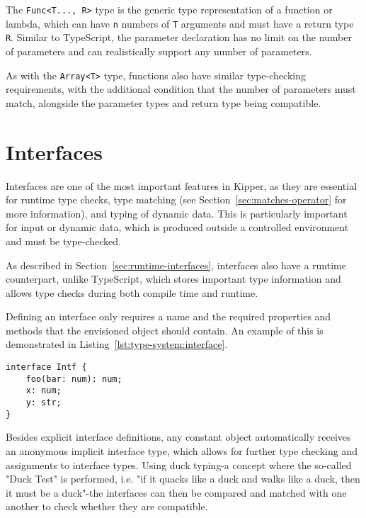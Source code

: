 The \lstinline|Func<T..., R>| type is the generic type representation of a function or lambda, which can have \lstinline|n| numbers of \lstinline|T| arguments and must have a return type \lstinline|R|. Similar to TypeScript, the parameter declaration has no limit on the number of parameters and can realistically support any number of parameters.

As with the \lstinline|Array<T>| type, functions also have similar type-checking requirements, with the additional condition that the number of parameters must match, alongside the parameter types and return type being compatible.

\section{Interfaces}
\label{sec:kipper-interfaces}

Interfaces are one of the most important features in Kipper, as they are essential for runtime type checks, type matching (see Section~\ref{sec:matches-operator} for more information), and typing of dynamic data. This is particularly important for input or dynamic data, which is produced outside a controlled environment and must be type-checked.

As described in Section~\ref{sec:runtime-interfaces}, interfaces also have a runtime counterpart, unlike TypeScript, which stores important type information and allows type checks during both compile time and runtime.

Defining an interface only requires a name and the required properties and methods that the envisioned object should contain. An example of this is demonstrated in Listing~\ref{lst:type-system:interface}.

\begin{lstlisting}[language=Kipper,caption=The definition of a simple interface with a method and properties,label=lst:type-system:interface]
interface Intf {
	foo(bar: num): num;
	x: num;
	y: str;
}
\end{lstlisting}

Besides explicit interface definitions, any constant object automatically receives an anonymous implicit interface type, which allows for further type checking and assignments to interface types. Using duck typing-a concept where the so-called "Duck Test" is performed, i.e. "if it quacks like a duck and walks like a duck, then it must be a duck"-the interfaces can then be compared and matched with one another to check whether they are compatible.

